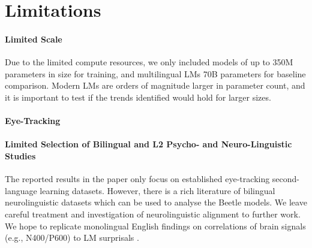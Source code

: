 

\section{Limitations}

\paragraph{Limited Scale} Due to the limited compute resources, we only included models of up to 350M parameters in size for training, and multilingual LMs 70B parameters for baseline comparison. Modern LMs are orders of magnitude larger in parameter count, and it is important to test if the trends identified would hold for larger sizes. 

\paragraph{Eye-Tracking}   

\paragraph{Limited Selection of Bilingual and L2 Psycho- and Neuro-Linguistic Studies} The reported results in the paper only focus on established eye-tracking second-language learning datasets. However, there is a rich literature of bilingual neurolinguistic datasets which can be used to analyse the Beetle models. We leave careful treatment and investigation of neurolinguistic alignment to further work.  We hope to replicate monolingual English findings on correlations of brain signals (e.g., N400/P600) to LM surprisals  \citep{michaelov2026better}. 


